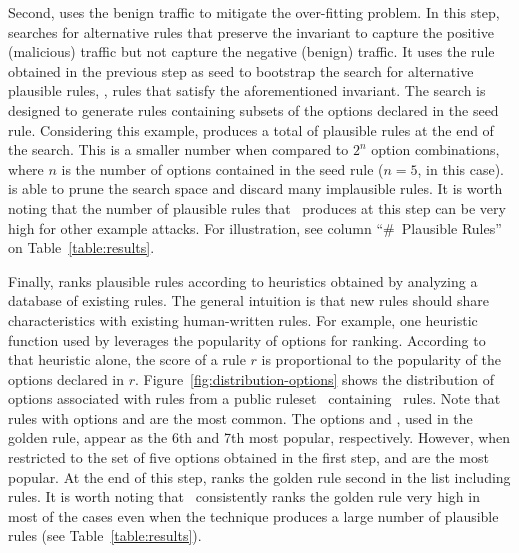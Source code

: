 \documentclass[conference]{IEEEtran}
\begin{document}


Second, \tname{} uses the benign traffic to mitigate the over-fitting
problem. In this step, \tname{} searches for alternative rules that
preserve the invariant to capture the positive (malicious) traffic
but not capture the negative (benign) traffic. It uses the rule obtained
in the previous step as seed to bootstrap the search for alternative
plausible rules, \ie{}, rules that satisfy the aforementioned
invariant. The search is designed to generate rules containing subsets
of the options declared in the seed rule. Considering this example,
\tname{} produces a total of \pingscanplausible{} plausible rules at
the end of the search. This is a smaller number when compared to $2^n$
option combinations, where $n$ is the number of options contained in
the seed rule ($n=5$, in this case). \tname{} is able to prune the
search space and discard many implausible rules. It is worth noting
that the number of plausible rules that \tname\ produces at this step
can be very high for other example attacks. For illustration, see
column ``\#~Plausible Rules'' on Table~\ref{table:results}.


Finally, \tname{} ranks plausible rules according to heuristics
obtained by analyzing a database of existing rules. The general
intuition is that new rules should share characteristics with existing
human-written rules. For example, one heuristic function used by
\tname{} leverages the popularity of options for ranking. According to
that heuristic alone, the score of a rule $r$ is proportional to the
popularity of the options declared in
$r$. Figure~\ref{fig:distribution-options} shows the distribution of
options associated with rules from a public
ruleset~\cite{emerging-threats-open} containing
\numrulessuri\ rules. Note that rules with options 
and  are the most common. The options  and
, used in the golden rule, appear as the 6th and 7th
most popular, respectively. However, when restricted to the set of
five options obtained in the first step,  and
 are the most popular. At the end of this step, \tname{}
ranks the golden rule second in the list including
\pingscanplausible{} rules. It is worth noting that
\tname\ consistently ranks the golden rule very high in most of the
cases even when the technique produces a large number of plausible
rules (see Table~\ref{table:results}).
\end{document}
